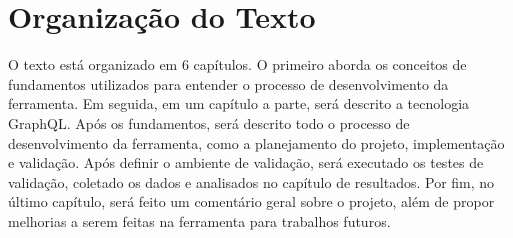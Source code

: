 \section[Organização do Texto]{Organização do Texto}

O texto está organizado em 6 capítulos. O primeiro aborda os conceitos de fundamentos utilizados para entender o processo de desenvolvimento da ferramenta. Em seguida, em um capítulo a parte, será descrito a tecnologia GraphQL. Após os fundamentos, será descrito todo o processo de desenvolvimento da ferramenta, como a planejamento do projeto, implementação e validação. Após definir o ambiente de validação, será executado os testes de validação, coletado os dados e analisados no capítulo de resultados. Por fim, no último capítulo, será feito um comentário geral sobre o projeto, além de propor melhorias a serem feitas na ferramenta para trabalhos futuros.
